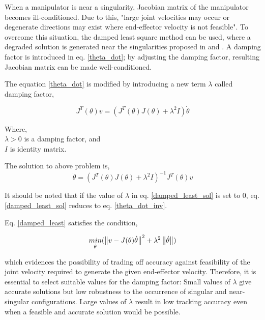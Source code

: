 When a manipulator is near a singularity, Jacobian matrix of the manipulator becomes ill-conditioned. Due to this, "large joint velocities may occur or degenerate directions may exist where end-effector velocity is not feasible"\cite{chiaverini1994review}. To overcome this situation, the damped least square method can be used, where a degraded solution is generated near the singularities proposed in \cite{wampler1986manipulator} and \cite{nakamura1986inverse}. A damping factor is introduced in eq. \ref{theta_dot}; by adjusting the damping factor, resulting Jacobian matrix can be made well-conditioned. 

The equation \ref{theta_dot} is modified by introducing a new term $\lambda$ called damping factor,

\begin{equation}\label{damped_least}
	J^{T}(\theta)v = (J^{T}(\theta)J(\theta) + \lambda ^{2}I)\dot{\theta}
\end{equation}

Where, \\
$\lambda > 0 $ is a damping factor, and \\
$I $ is identity matrix. 

The solution to above problem is, 
\begin{equation}\label{damped_least_sol}
	\dot{\theta} = (J^{T}(\theta)J(\theta) + \lambda^{2}I)^{-1}J^{T}(\theta)v
\end{equation} 

It should be noted that if the value of $\lambda$ in eq. \ref{damped_least_sol} is set to 0, eq. \ref{damped_least_sol} reduces to eq. \ref{theta_dot_inv}.

Eq. \ref{damped_least} satisfies the condition,

\begin{equation}
	\underset{\dot{\theta}}{min}(\left\lVert v - J(\theta)\dot{\theta}\right\rVert^{2} + \lambda^{2}\left\lVert\dot{\theta}\right\rVert)
\end{equation}

which evidences the possibility of trading off accuracy against feasibility of the joint velocity required to generate the given end-effector velocity. Therefore, it is essential to select suitable values for the damping factor: Small values of $\lambda$ give accurate solutions but low robustness to the occurrence of singular and near-singular configurations. Large values of $\lambda$ result in low tracking accuracy even when a feasible and accurate solution would be possible\cite{chiaverini1994review}.

